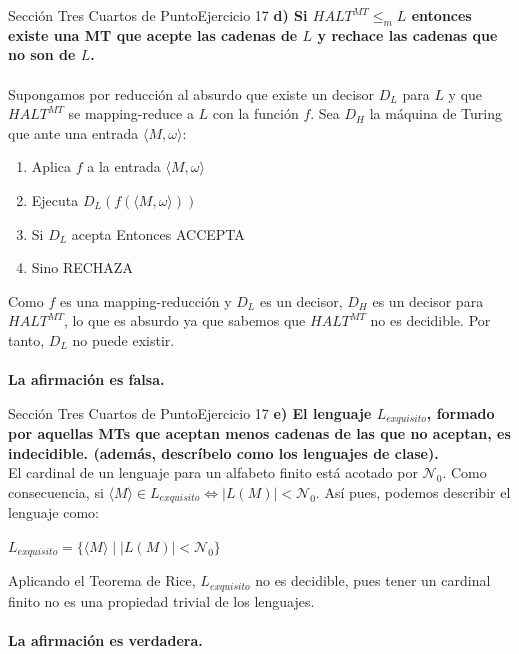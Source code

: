 \documentclass[10pt, envcountsect, presentation, aspectratio=169]{beamer}
\begin{document}
\begin{frame}{Sección Tres Cuartos de Punto}{Ejercicio 17}
    \textbf{d) Si $HALT^{MT} \le_m L$ entonces existe una MT  que acepte las cadenas de $L$ y rechace las cadenas que no son de $L$.}\\~\\    

    Supongamos por reducción al absurdo que existe un decisor $D_L$ para $L$ y que $HALT^{MT}$ se mapping-reduce a $L$ con la función $f$.
    Sea $D_H$ la máquina de Turing que ante una entrada $\langle M,\omega \rangle$:
    \begin{enumerate}[1.]
        \item Aplica $f$ a la entrada $\langle M,\omega \rangle$
        \item Ejecuta $D_L(f(\langle M,\omega \rangle))$
        \item Si $D_L$ acepta Entonces ACCEPTA
        \item Sino RECHAZA
    \end{enumerate}

    Como $f$ es una mapping-reducción y $D_L$ es un decisor, $D_H$ es un decisor para $HALT^{MT}$, lo que es absurdo ya que sabemos que $HALT^{MT}$ no es decidible.
    Por tanto, $D_L$ no puede existir.\\~\\

    \textbf{La afirmación es falsa.}
\end{frame}


\begin{frame}{Sección Tres Cuartos de Punto}{Ejercicio 17}
    \textbf{e) El lenguaje $L_{exquisito}$, formado por aquellas MTs que aceptan menos cadenas de las que no aceptan, es indecidible. (además, descríbelo como los lenguajes de clase).}\\
    El cardinal de un lenguaje para un alfabeto finito está acotado por $\mathcal{N}_0$. Como consecuencia, si $\langle M \rangle \in L_{exquisito} \Leftrightarrow |L(M)|<\mathcal{N}_0$.
    Así pues, podemos describir el lenguaje como: 
    \begin{center}
        $L_{exquisito}=\{\langle M \rangle \mid |L(M)|< \mathcal{N}_0\}$
    \end{center}
    Aplicando el Teorema de Rice, $L_{exquisito}$ no es decidible, pues tener un cardinal finito no es una propiedad trivial de los lenguajes.\\~\\

    \textbf{La afirmación es verdadera.}
    
\end{frame}
\end{document}
